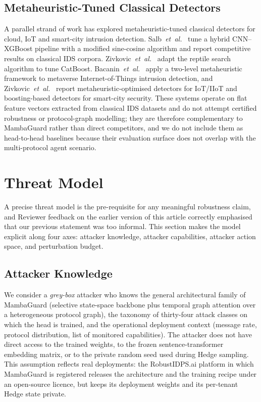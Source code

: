 \documentclass{ieeeaccess}
\begin{document}
\subsection{Metaheuristic-Tuned Classical Detectors}
A parallel strand of work has explored metaheuristic-tuned classical detectors for cloud, IoT and smart-city intrusion detection. Salb~\textit{et~al.}~\cite{Salb2023SCACloud} tune a hybrid CNN--XGBoost pipeline with a modified sine-cosine algorithm and report competitive results on classical IDS corpora. Zivkovic~\textit{et~al.}~\cite{Zivkovic2023CatBoostReptile} adapt the reptile search algorithm to tune CatBoost. Bacanin~\textit{et~al.}~\cite{Bacanin2024MetaverseIDS} apply a two-level metaheuristic framework to metaverse Internet-of-Things intrusion detection, and Zivkovic~\textit{et~al.}~\cite{Zivkovic2023IoTSoftware,Zivkovic2022BoostingSmartCity} report metaheuristic-optimised detectors for IoT/IIoT and boosting-based detectors for smart-city security. These systems operate on flat feature vectors extracted from classical IDS datasets and do not attempt certified robustness or protocol-graph modelling; they are therefore complementary to MambaGuard rather than direct competitors, and we do not include them as head-to-head baselines because their evaluation surface does not overlap with the multi-protocol agent scenario.

\section{Threat Model}
\label{sec:threat}
A precise threat model is the pre-requisite for any meaningful robustness claim, and Reviewer feedback on the earlier version of this article correctly emphasised that our previous statement was too informal. This section makes the model explicit along four axes: attacker knowledge, attacker capabilities, attacker action space, and perturbation budget.

\subsection{Attacker Knowledge}
We consider a \emph{grey-box} attacker who knows the general architectural family of MambaGuard (selective state-space backbone plus temporal graph attention over a heterogeneous protocol graph), the taxonomy of thirty-four attack classes on which the head is trained, and the operational deployment context (message rate, protocol distribution, list of monitored capabilities). The attacker does not have direct access to the trained weights, to the frozen sentence-transformer embedding matrix, or to the private random seed used during Hedge sampling. This assumption reflects real deployments: the RobustIDPS.ai platform in which MambaGuard is registered releases the architecture and the training recipe under an open-source licence, but keeps its deployment weights and its per-tenant Hedge state private.
\end{document}

